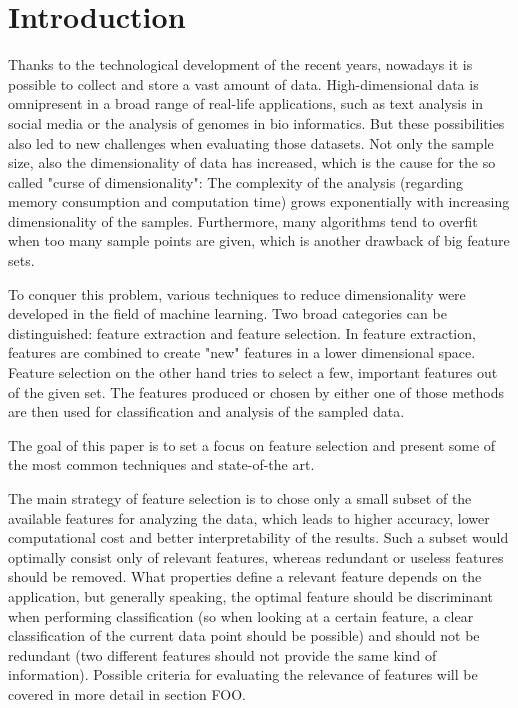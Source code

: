 \section{Introduction}
\label{sec:introduction}


Thanks to the technological development of the recent years, nowadays it is possible to collect and store a vast amount of data. High-dimensional data is omnipresent in a broad range of real-life applications, such as text analysis in social media or the analysis of genomes in bio informatics. But these possibilities also led to new challenges when evaluating those datasets. Not only the sample size, also the dimensionality of data has increased, which is the cause for the so called "curse of dimensionality": The complexity of the analysis (regarding memory consumption and computation time) grows exponentially with increasing dimensionality of the samples. Furthermore, many algorithms tend to overfit when too many sample points are given, which is another drawback of big feature sets. \cite{2001:Feature selection with NN, p1333}

To conquer this problem, various techniques to reduce dimensionality were developed in the field of machine learning. Two broad categories can be distinguished: feature extraction and feature selection. 
In feature extraction, features are combined to create "new" features in a lower dimensional space. Feature selection on the other hand tries to select a few, important features out of the given set.
The features produced or chosen by either one of those methods are then used for classification and analysis of the sampled data. 

The goal of this paper is to set a focus on feature selection and present some of the most common techniques and state-of-the art.

The main strategy of feature selection is to chose only a small subset of the available features for analyzing the data, which leads to higher accuracy, lower computational cost and better interpretability of the results.\cite{} Such a subset would optimally consist only of relevant features, whereas redundant or useless features should be removed. What properties define a relevant feature depends on the application, but generally speaking, the optimal feature should be discriminant when performing classification (so when looking at a certain feature, a clear classification of the current data point should be possible)
and should not be redundant (two different features should not provide the same kind of information). Possible criteria for evaluating the relevance of features will be covered in more detail in section FOO.

